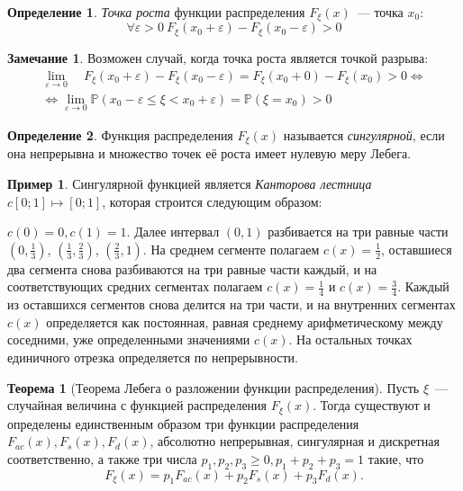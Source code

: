 \documentclass[oneside,final,14pt]{extreport}
\theoremstyle{plain}
\theoremstyle{definition}
\newtheorem*{defn}{Определение}
\newtheorem*{exmp}{Пример}
\newtheorem*{rmrk}{Замечание}
\theoremstyle{named}
\newtheorem*{namedthm}{Теорема}
\begin{document}
\begin{defn}
    {\it Точка роста} функции распределения $F_\xi(x)$~--- точка $x_0$:
\begin{equation*}
    \forall \varepsilon > 0~ F_\xi(x_0 + \varepsilon) - F_\xi(x_0 - \varepsilon) > 0
\end{equation*}
\end{defn}

\begin{rmrk}
    Возможен случай, когда точка роста является точкой разрыва:
    \begin{multline*}
    \lim _{\varepsilon \to 0} \quad F_{\xi}\left(x_{0}+\varepsilon\right)-F_{\xi}\left(x_{0}-\varepsilon\right)=F_{\xi}\left(x_{0}+0\right)-F_{\xi}\left(x_{0}\right)>0 \Leftrightarrow \\
    \Leftrightarrow \lim_{\varepsilon \to 0}\mathbb{P}\left(x_{0}-\varepsilon \leqslant \xi<x_{0}+\varepsilon\right)=\mathbb{P}\left(\xi=x_{0}\right)>0
    \end{multline*}
\end{rmrk}

\begin{defn}
    Функция распределения $F_\xi(x)$ называется {\it сингулярной}, если она непрерывна и множество точек её роста имеет нулевую меру Лебега.
\end{defn}
\begin{exmp}
    Сингулярной функцией является \textit{Канторова лестница} $c [0;1] \mapsto [0;1]$, которая строится следующим образом:
    
    $c(0) = 0, c(1) = 1$. Далее интервал $(0, 1)$ разбивается на три равные части $(0, \frac{1}{3})$, $(\frac{1}{3}, \frac{2}{3})$, $(\frac{2}{3}, 1)$. На среднем сегменте полагаем $c(x) = \frac{1}{2}$, оставшиеся два сегмента снова разбиваются на три равные части каждый, и на соответствующих средних сегментах полагаем $c(x) = \frac{1}{4}$ и $c(x) = \frac{3}{4}$. Каждый из оставшихся сегментов снова делится на три части, и на внутренних сегментах $c(x)$ определяется как постоянная, равная среднему арифметическому между соседними, уже определенными значениями $c(x)$. На остальных точках единичного отрезка определяется по непрерывности. 
\end{exmp}

\begin{namedthm}[Теорема Лебега о разложении функции распределения]
    Пусть $\xi$~--- случайная величина с функцией распределения $F_\xi(x).$ Тогда существуют и определены единственным образом три функции распределения $F_{ac}(x), F_s(x), F_d(x)$, абсолютно непрерывная, сингулярная и дискретная соответственно, а также три числа $p_1, p_2, p_3 \geqslant 0, p_1 + p_2 + p_3 = 1$ такие, что 
    \begin{equation*}
        F_{\xi}(x)=p_{1} F_{ac}(x)+p_{2} F_{s}(x)+p_{3} F_{d}(x).
    \end{equation*}
\end{namedthm}
\end{document}
